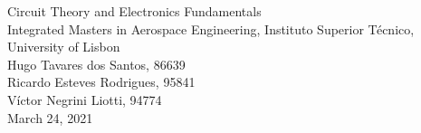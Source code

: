 
\thispagestyle {empty}


\begin{center}
%
\vspace{1.0cm}

\vspace{1cm}
{\FontLb Circuit Theory and Electronics Fundamentals} \\ %
\vspace{1cm}
{\FontSn Integrated Masters in Aerospace Engineering, Instituto Superior Técnico, University of Lisbon} \\ %
\vspace{1cm}
{\FontSn Hugo Tavares dos Santos, 86639} \\
\vspace{0.5cm}
{\FontSn Ricardo Esteves Rodrigues, 95841} \\
\vspace{0.5cm}
{\FontSn Víctor Negrini Liotti, 94774} \\
\vspace{1cm}
{\FontSn March 24, 2021} \\ %
%
\end{center}


